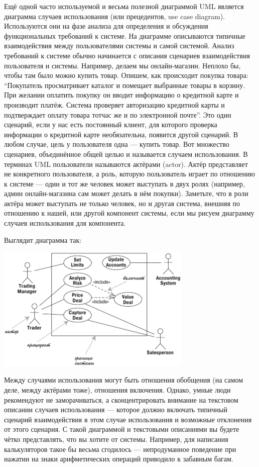 \documentclass[a5paper]{article}
\begin{document}
Ещё одной часто используемой и весьма полезной диаграммой UML является диаграмма случаев использования (или прецедентов, use case diagram). Используются они на фазе анализа для определения и обсуждения функциональных требований к системе. На диаграмме описываются типичные взаимодействия между пользователями системы и самой системой. Анализ требований к системе обычно начинается с описания сценариев взаимодействия пользователя и системы. Например, делаем мы онлайн-магазин. Неплохо бы, чтобы там было можно купить товар. Опишем, как происходит покупка товара: ``Покупатель просматривает каталог и помещает выбранные товары в корзину. При желании оплатить покупку он вводит информацию о кредитной карте и производит платёж. Система проверяет авторизацию кредитной карты и подтверждает оплату товара тотчас же и по электронной почте''. Это один сценарий, если у нас есть постоянный клиент, для которого проверка информации о кредитной карте необязательна, появится другой сценарий. В любом случае, цель у пользователя одна --- купить товар. Вот множество сценариев, объединённое общей целью и называется случаем использования. В терминах UML пользователи называются актёрами (actor). Актёр представляет не конкретного пользователя, а роль, которую пользователь играет по отношению к системе --- один и тот же человек может выступать в двух ролях (например, админ онлайн-магазина сам может делать в нём покупки). Заметьте, что в роли актёра может выступать не только человек, но и другая система, внешняя по отношению к нашей, или другой компонент системы, если мы рисуем диаграмму случаев использования для компонента. 

Выглядит диаграмма так:

\begin{center}
	\includegraphics[width=0.7\textwidth]{useCaseDiagram.png}
\end{center}

Между случаями использования могут быть отношения обобщения (на самом деле, между актёрами тоже), отношения включения. Однако, умные люди рекомендуют не заморачиваться, а сконцентрировать внимание на текстовом описании случаев использования --- которое должно включать типичный сценарий взаимодействия в этом случае использования и возможные отклонения от этого сценария. С такой диаграммой и текстовыми описаниями вы будете чётко представлять, что вы хотите от системы. Например, для написания калькуляторов такое бы весьма сгодилось --- непродуманное поведение при нажатии на знаки арифметических операций приводило к забавным багам.
\end{document}
